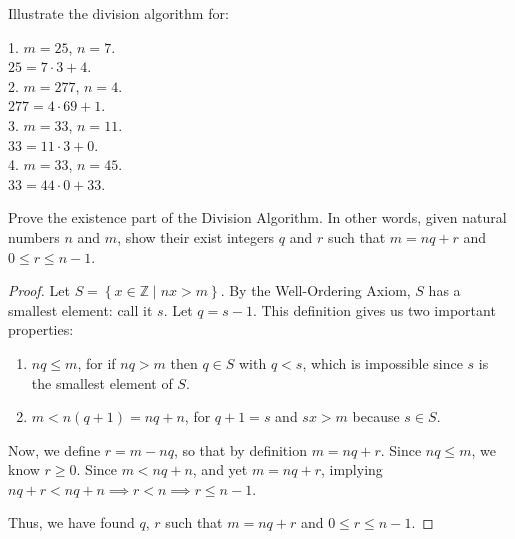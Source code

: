 \documentclass[../main.tex]{subfiles}
\begin{document}
\begin{ex} \label{1.25}
Illustrate the division algorithm for:
\end{ex}

\hspace*{0.1mm} 1. $m = 25$, $n = 7$. \\
\hspace*{15mm} $25 = 7 \cdot 3 + 4$. \\

\hspace*{5mm} 2. $m = 277$, $n = 4$. \\
\hspace*{15mm} $277 = 4 \cdot 69 + 1$. \\

\hspace*{5mm} 3. $m = 33$, $n = 11$. \\
\hspace*{15mm} $33 = 11 \cdot 3 + 0$. \\

\hspace*{5mm} 4. $m = 33$, $n = 45$. \\
\hspace*{15mm} $33 = 44 \cdot 0 + 33$.



\begin{thm} \label{1.26}
Prove the existence part of the Division Algorithm. In other words, given natural numbers $n$ and $m$, show their exist integers $q$ and $r$ such that $m = nq + r$ and $0 \leq r \leq n-1$.
\end{thm}

\begin{proof}
Let $S = \left\{x \in \mathbb{Z} \mid nx > m\right\}$. By the Well-Ordering Axiom, $S$ has a smallest element: call it $s$. Let $q = s-1$. This definition gives us two important properties:

\begin{enumerate}
\item $nq \leq m$, for if $nq > m$ then $q \in S$ with $q < s$, which is impossible since $s$ is the smallest element of $S$.

\item $m < n(q+1) = nq + n$, for $q+1 = s$ and $sx > m$ because $s \in S$.
\end{enumerate}

Now, we define $r = m - nq$, so that by definition $m = nq + r$.
Since $nq \leq m$, we know $r \geq 0$.
Since $m < nq + n$, and yet $m = nq + r$, implying $nq + r < nq + n \implies r < n \implies r \leq n - 1$.

Thus, we have found $q$, $r$ such that $m = nq + r$ and $0 \leq r \leq n - 1$.
\end{proof}
\end{document}
